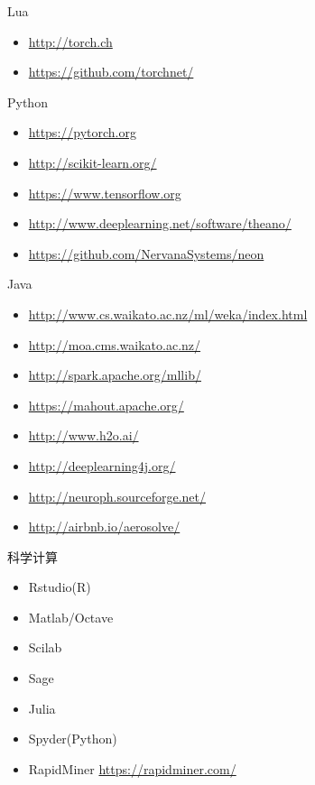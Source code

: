 \documentclass[presentation]{beamer}
\begin{document}
\begin{frame}[label={sec:orgda5c3df}]{Lua}
\begin{itemize}
\item \url{http://torch.ch}
\item \url{https://github.com/torchnet/}
\end{itemize}
\end{frame}

\begin{frame}[label={sec:orgeaca629}]{Python}
\begin{itemize}
\item \url{https://pytorch.org}
\item \url{http://scikit-learn.org/}
\item \url{https://www.tensorflow.org}
\item \url{http://www.deeplearning.net/software/theano/}
\item \url{https://github.com/NervanaSystems/neon}
\end{itemize}
\end{frame}
\begin{frame}[label={sec:org9c7d007}]{Java}
\begin{itemize}
\item \url{http://www.cs.waikato.ac.nz/ml/weka/index.html}
\item \url{http://moa.cms.waikato.ac.nz/}
\item \url{http://spark.apache.org/mllib/}
\item \url{https://mahout.apache.org/}
\item \url{http://www.h2o.ai/}
\item \url{http://deeplearning4j.org/}
\item \url{http://neuroph.sourceforge.net/}
\item \url{http://airbnb.io/aerosolve/}
\end{itemize}
\end{frame}
\begin{frame}[label={sec:orge09b7ff}]{科学计算}
\begin{itemize}
\item Rstudio(R)
\item Matlab/Octave
\item Scilab
\item Sage
\item Julia
\item Spyder(Python)
\item RapidMiner \url{https://rapidminer.com/}
\end{itemize}
\end{frame}
\end{document}
